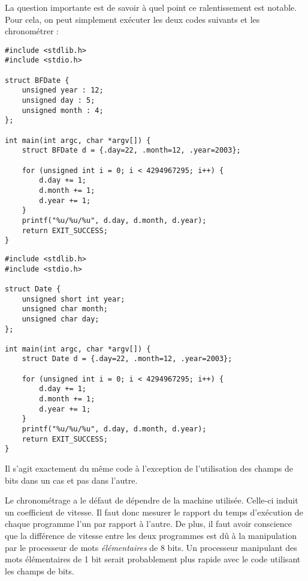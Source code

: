 \documentclass[../../../main.tex]{subfiles}
\begin{document}
La question importante est de savoir à quel point ce ralentissement est notable.
Pour cela, on peut simplement exécuter les deux codes suivants et les chronométrer :

\begin{minipage}{0.5\textwidth}
	\begin{verbatim}
#include <stdlib.h>
#include <stdio.h>

struct BFDate {
	unsigned year : 12;
	unsigned day : 5;
	unsigned month : 4;
};

int main(int argc, char *argv[]) {
	struct BFDate d = {.day=22, .month=12, .year=2003};

	for (unsigned int i = 0; i < 4294967295; i++) {
		d.day += 1;
		d.month += 1;
		d.year += 1;
	}
	printf("%u/%u/%u", d.day, d.month, d.year);
	return EXIT_SUCCESS;
}
	\end{verbatim}
\end{minipage}
\begin{minipage}{0.5\textwidth}
	\begin{verbatim}
#include <stdlib.h>
#include <stdio.h>

struct Date {
	unsigned short int year;
	unsigned char month;
	unsigned char day;
};

int main(int argc, char *argv[]) {
	struct Date d = {.day=22, .month=12, .year=2003};

	for (unsigned int i = 0; i < 4294967295; i++) {
		d.day += 1;
		d.month += 1;
		d.year += 1;
	}
	printf("%u/%u/%u", d.day, d.month, d.year);
	return EXIT_SUCCESS;
}
	\end{verbatim}
\end{minipage}

Il s'agit exactement du même code à l'exception de l'utilisation des champs de bits dans un cas et pas dans l'autre.

Le chronométrage a le défaut de dépendre de la machine utilisée. Celle-ci induit un coefficient de vitesse. Il faut donc mesurer le rapport du temps d'exécution de chaque programme l'un par rapport à l'autre. De plus, il faut avoir conscience que la différence de vitesse entre les deux programmes est dû à la manipulation par le processeur de mots \textit{élémentaires} de 8 bits. Un processeur manipulant des mots élémentaires de 1 bit serait probablement plus rapide avec le code utilisant les champs de bits.
\end{document}
